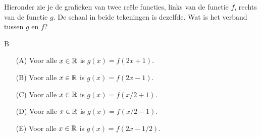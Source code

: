 \newpage
\begin{oefening2}

Hieronder zie je de grafieken van twee re\"ele functies, links van de functie $f$, rechts van de functie $g$.
De schaal in beide tekeningen is dezelfde. Wat is het verband tussen $g$ en $f$?
\begin{opl}
B
\end{opl}

\begin{enumerate}
\item [(A)]Voor alle $x\in\mathbb{R}$ is $g(x)=f(2x+1)$.
\item [(B)] Voor alle $x\in\mathbb{R}$ is $g(x)=f(2x-1)$.
\item [(C)] Voor alle $x\in\mathbb{R}$ is $g(x)=f(x/2+1)$.
\item [(D)] Voor alle $x\in\mathbb{R}$ is $g(x)=f(x/2-1)$.
\item [(E)] Voor alle $x\in\mathbb{R}$ is $g(x)=f(2x-1/2)$.
\end{enumerate}

\end{oefening2}

